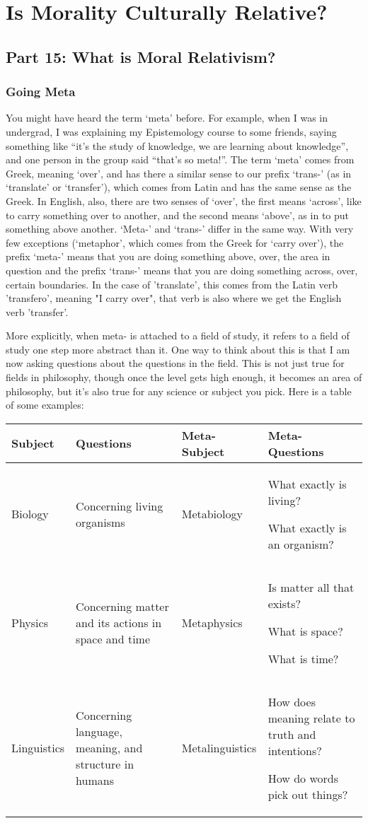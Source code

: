 \part{Is Morality Culturally Relative?}
\label{ch.modseven}

\chapter{Part 15: What is Moral Relativism?}
\section{Going Meta}

You might have heard the term ‘meta’ before. For example, when I was in undergrad, I was explaining my Epistemology course to some friends, saying something like “it’s the study of knowledge, we are learning about knowledge”, and one person in the group said “that’s so meta!”. The term ‘meta’ comes from Greek, meaning ‘over’, and has there a similar sense to our prefix ‘trans-’ (as in ‘translate’ or ‘transfer’), which comes from Latin and has the same sense as the Greek. In English, also, there are two senses of ‘over’, the first means ‘across’, like to carry something over to another, and the second means ‘above’, as in to put something above another. ‘Meta-’ and ‘trans-’ differ in the same way. With very few exceptions (‘metaphor’, which comes from the Greek for ‘carry over’), the prefix ‘meta-’ means that you are doing something above, over, the area in question and the prefix ‘trans-’ means that you are doing something across, over, certain boundaries. In the case of 'translate', this comes from the Latin verb 'transfero', meaning "I carry over", that verb is also where we get the English verb 'transfer'.

More explicitly, when \gls{meta-} is attached to a field of study, it refers to a field of study one step more abstract than it. One way to think about this is that I am now asking questions about the questions in the field. This is not just true for fields in philosophy, though once the level gets high enough, it becomes an area of philosophy, but it’s also true for any science or subject you pick. Here is a table of some examples:
\begin{tabular}{p{0.75in}|p{1in}|p{0.9in}|p{1in}}
Subject&Questions &Meta-Subject&Meta-Questions\\\hline
Biology&Concerning living organisms&Metabiology&What exactly is living? 

What exactly is an organism?\\\hline
Physics&Concerning matter and its actions in space and time&Metaphysics&Is matter all that exists? 

What is space? 

What is time?\\ \hline
Linguistics&Concerning language, meaning, and structure in humans&Metalinguistics&How does meaning relate to truth and intentions? 

How do words pick out things? \\
\end{tabular}

